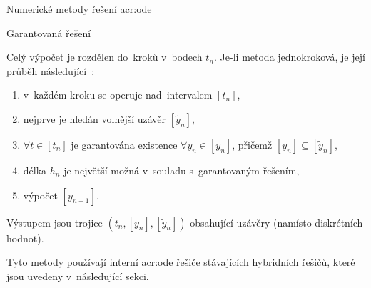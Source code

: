 \documentclass[thesis=M,czech]{FITthesis}[2012/06/26]
\newcommand{\acrlabel}[1]{acr:#1}
\newcommand{\acr}[1]{\acrshort{\acrlabel{#1}}}
\newcommand{\cit}[1]{\cite{#1}}
\newcommand{\pred}[1]{\ensuremath{\tilde{#1}}}
\begin{document}
\begin{section}{Numerické metody řešení \acr{ode}}
\begin{subsection}{Garantovaná řešení}

\bigskip

Celý výpočet je rozdělen do~kroků v~bodech $t_n$.
Je-li metoda jednokroková,
je její průběh následující~\cit{ode-valid-runge_kutta-art}:
\begin{enumerate}
\item v~každém kroku se operuje nad~intervalem ${[t_{n}]}$,
\item nejprve je hledán volnější uzávěr ${[\pred{y}_n]}$,
\item ${\forall t \in [t_n]}$ je garantována existence
   ${\forall y_n \in [y_n]}$, přičemž
   ${[y_n] \subseteq [\pred{y}_n]}$,
\item délka $h_n$ je největší možná v~souladu s~garantovaným řešením,
\item výpočet ${[y_{n+1}]}$.
\end{enumerate}
Výstupem jsou trojice ${(t_n, [y_n], [\pred{y}_n])}$
obsahující uzávěry (namísto diskrétních hodnot).

Tyto metody používají interní \acr{ode} řešiče
stávajících hybridních řešičů,
které jsou uvedeny v~následující sekci.
\end{subsection} %


\end{section} %

\end{document}
